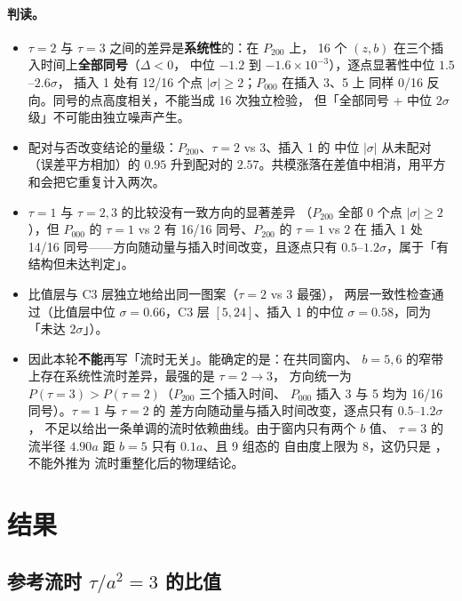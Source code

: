 \documentclass[UTF8,a4paper,11pt]{ctexart}
\newcommand{\code}[1]{\texttt{\detokenize{#1}}}
\begin{document}
\paragraph{判读。}
\begin{itemize}
  \item $\tau=2$ 与 $\tau=3$ 之间的差异是\textbf{系统性}的：在 $P_{200}$ 上，
        16 个 $(z,b)$ 在三个插入时间上\textbf{全部同号}（$\Delta<0$，
        中位 $-1.2$ 到 $-1.6\times10^{-3}$），逐点显著性中位 $1.5$--$2.6\sigma$，
        插入 1 处有 12/16 个点 $|\sigma|\ge2$；$P_{000}$ 在插入 3、5 上
        同样 0/16 反向。同号的点高度相关，不能当成 16 次独立检验，
        但「全部同号 + 中位 $2\sigma$ 级」不可能由独立噪声产生。
  \item 配对与否改变结论的量级：$P_{200}$、$\tau=2$ vs $3$、插入 1 的
        中位 $|\sigma|$ 从未配对（误差平方相加）的 $0.95$ 升到配对的
        $2.57$。共模涨落在差值中相消，用平方和会把它重复计入两次。
  \item $\tau=1$ 与 $\tau=2,3$ 的比较没有一致方向的显著差异
        （$P_{200}$ 全部 $0$ 个点 $|\sigma|\ge2$），但 $P_{000}$ 的
        $\tau=1$ vs $2$ 有 16/16 同号、$P_{200}$ 的 $\tau=1$ vs $2$ 在
        插入 1 处 14/16 同号——方向随动量与插入时间改变，且逐点只有
        $0.5$--$1.2\sigma$，属于「有结构但未达判定」。
  \item 比值层与 C3 层独立地给出同一图案（$\tau=2$ vs $3$ 最强），
        两层一致性检查通过（比值层中位 $\sigma=0.66$，C3 层
        $[5,24]$、插入 1 的中位 $\sigma=0.58$，同为「未达 $2\sigma$」）。
  \item 因此本轮\textbf{不能}再写「流时无关」。能确定的是：在共同窗内、
        $b=5,6$ 的窄带上存在系统性流时差异，最强的是 $\tau=2\to3$，
        方向统一为 $P(\tau=3)>P(\tau=2)$（$P_{200}$ 三个插入时间、
        $P_{000}$ 插入 3 与 5 均为 16/16 同号）。$\tau=1$ 与 $\tau=2$ 的
        差方向随动量与插入时间改变，逐点只有 $0.5$--$1.2\sigma$，
        不足以给出一条单调的流时依赖曲线。由于窗内只有两个 $b$ 值、
        $\tau=3$ 的流半径 $4.90a$ 距 $b=5$ 只有 $0.1a$、且 9 组态的
        自由度上限为 8，这仍只是 \code{diagnostic\_only}，不能外推为
        流时重整化后的物理结论。
\end{itemize}

\section{结果}

\subsection{参考流时 $\tau/a^2=3$ 的比值}
\end{document}
